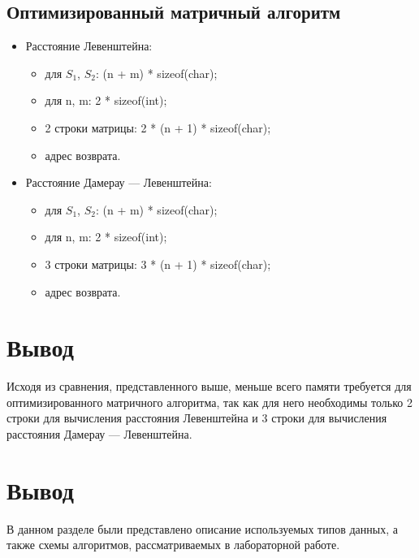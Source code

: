 \subsection{Оптимизированный матричный алгоритм}

\begin{itemize}[label={---}]
	\item Расстояние Левенштейна:
	\begin{itemize}
		\item для $S_1$, $S_2$: (n + m) * sizeof(char);
		\item для n, m: 2 * sizeof(int);
		\item 2 строки матрицы: 2 * (n + 1) * sizeof(char);
		\item адрес возврата.
	\end{itemize}
	
	\item Расстояние Дамерау --- Левенштейна:
	\begin{itemize}
		\item для $S_1$, $S_2$: (n + m) * sizeof(char);
		\item для n, m: 2 * sizeof(int);
		\item 3 строки матрицы: 3 * (n + 1) * sizeof(char);
		\item адрес возврата.
	\end{itemize}
\end{itemize}

\section*{Вывод}
Исходя из сравнения, представленного выше, меньше всего памяти требуется для оптимизированного матричного алгоритма, так как для него необходимы только 2 строки для вычисления расстояния Левенштейна и 3 строки для вычисления расстояния Дамерау --- Левенштейна.

\section*{Вывод}

В данном разделе были представлено описание используемых типов данных, а также схемы алгоритмов, рассматриваемых в лабораторной работе.



